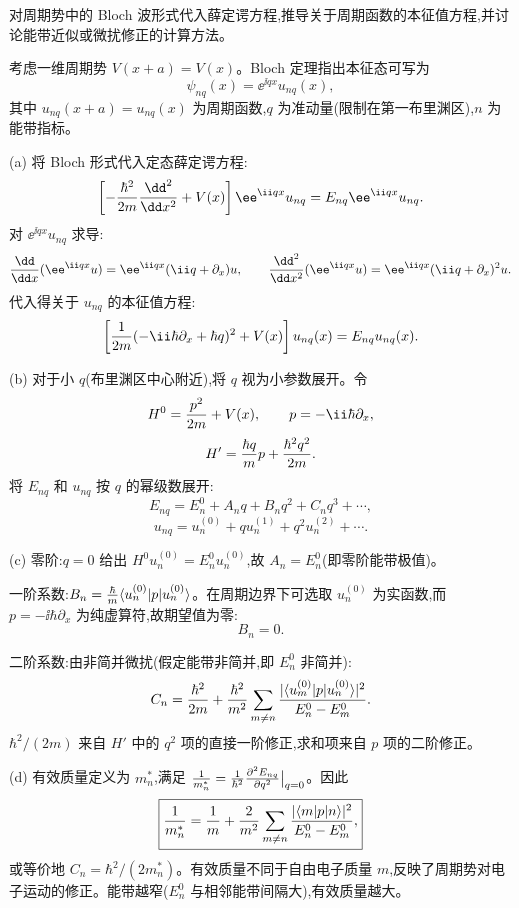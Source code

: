 \begin{question}
对周期势中的 Bloch 波形式代入薛定谔方程,推导关于周期函数的本征值方程,并讨论能带近似或微扰修正的计算方法。
\end{question}
\begin{solution}
考虑一维周期势 $V(x+a)=V(x)$。Bloch 定理指出本征态可写为
\[
\psi_{nq}(x) = \ee^{\ii qx} u_{nq}(x),
\]
其中 $u_{nq}(x+a)=u_{nq}(x)$ 为周期函数,$q$ 为准动量(限制在第一布里渊区),$n$ 为能带指标。

(a) 将 Bloch 形式代入定态薛定谔方程:
\[
\left[-{\hbar^2\over2m}{\dd^2\over\dd x^2} + V(x)\right] \ee^{\ii qx}u_{nq} = E_{nq} \ee^{\ii qx}u_{nq}.
\]
对 $\ee^{\ii qx}u_{nq}$ 求导:
\[
{\dd\over\dd x}(\ee^{\ii qx}u) = \ee^{\ii qx}(\ii q + \partial_x)u,
\qquad
{\dd^2\over\dd x^2}(\ee^{\ii qx}u) = \ee^{\ii qx}(\ii q+\partial_x)^2u.
\]
代入得关于 $u_{nq}$ 的本征值方程:
\[
\left[{1\over2m}(-\ii\hbar\partial_x + \hbar q)^2 + V(x)\right]u_{nq}(x) = E_{nq} u_{nq}(x).
\]

(b) 对于小 $q$(布里渊区中心附近),将 $q$ 视为小参数展开。令
\[
H^0 = {p^2\over2m} + V(x),\qquad p = -\ii\hbar\partial_x,
\]
\[
H' = {\hbar q\over m}p + {\hbar^2 q^2\over2m}.
\]
将 $E_{nq}$ 和 $u_{nq}$ 按 $q$ 的幂级数展开:
\[
E_{nq} = E_n^0 + A_n q + B_n q^2 + C_n q^3 + \cdots,
\]
\[
u_{nq} = u_n^{(0)} + q u_n^{(1)} + q^2 u_n^{(2)} + \cdots.
\]

(c) 零阶:$q=0$ 给出 $H^0 u_n^{(0)} = E_n^0 u_n^{(0)}$,故 $A_n = E_n^0$(即零阶能带极值)。

一阶系数:$B_n = {\hbar\over m}\langle u_n^{(0)}|p|u_n^{(0)}\rangle$。在周期边界下可选取 $u_n^{(0)}$ 为实函数,而 $p=-\ii\hbar\partial_x$ 为纯虚算符,故期望值为零:
\[
B_n = 0.
\]

二阶系数:由非简并微扰(假定能带非简并,即 $E_n^0$ 非简并):
\[
C_n = {\hbar^2\over2m} + {\hbar^2\over m^2}\sum_{m\ne n}{|\langle u_m^{(0)}|p|u_n^{(0)}\rangle|^2\over E_n^0 - E_m^0}.
\]
${\hbar^2/(2m)}$ 来自 $H'$ 中的 $q^2$ 项的直接一阶修正,求和项来自 $p$ 项的二阶修正。

(d) 有效质量定义为 $m_n^*$,满足 ${1\over m_n^*} = {1\over\hbar^2}{\partial^2 E_{nq}\over\partial q^2}\big|_{q=0}$。因此
\[
\boxed{{1\over m_n^*} = {1\over m} + {2\over m^2}\sum_{m\ne n}{|\langle m|p|n\rangle|^2\over E_n^0 - E_m^0},}
\]
或等价地 $\boxed{C_n = \hbar^2/(2m_n^*)}$。有效质量不同于自由电子质量 $m$,反映了周期势对电子运动的修正。能带越窄($E_n^0$ 与相邻能带间隔大),有效质量越大。
\end{solution}
